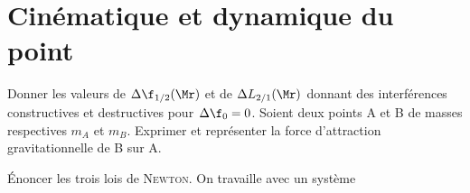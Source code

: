 \documentclass[a4paper, 10pt, final, garamond]{book}
\begin{document}
\setcounter{chapter}{13}

\chapter{Cinématique et dynamique du point}

\begin{enumerate}[label=\sqenumi]
	Donner les valeurs de $\Delta{\f_{1/2}(\Mr)}$ et de
	$\Delta{L_{2/1}(\Mr)}$ donnant des interférences constructives et destructives
	pour $\Delta{\f_0}=0$.
	\smallbreak
	\vspace{-30pt}
	\vspace{-15pt}
	Soient deux points A et B de masses respectives $m_A$ et $m_B$. Exprimer et
	représenter la force d'attraction gravitationnelle de B sur A.
	\smallbreak
	\noindent
	\begin{minipage}{.6\linewidth}
		\psw{
			\vspace{-15pt}
			\[
				\Ff_{g,\rm B\ra A} \stm{=} -\Gc \frac{m_Am_B}{\rm BA^2}\ur
				\qavec
				\ur = \frac{\vv{\rm BA}}{\rm BA}
			\]
			\vspace{-15pt}
		}
	\end{minipage}
	\hfill
	\noindent
	\begin{minipage}{.39\linewidth}
		\begin{center}
		\end{center}
	\end{minipage}
	\vspace{-15pt}
	Énoncer les trois lois de \textsc{Newton}. On travaille avec un système

\end{enumerate}
\end{document}
